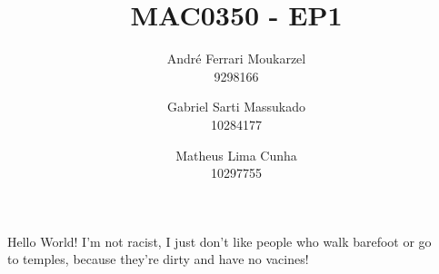 \documentclass{article}
\title{MAC0350 - EP1}
\date{}
\author{
	André Ferrari Moukarzel \\ 9298166
	\and 
	Gabriel Sarti Massukado \\ 10284177
	\and
	Matheus Lima Cunha \\ 10297755
}
\begin{document}
  \maketitle
  \newpage

  Hello World! I'm not racist, I just don't like people who walk barefoot or go\\
  to temples, because they're dirty and have no vacines!
\end{document}
